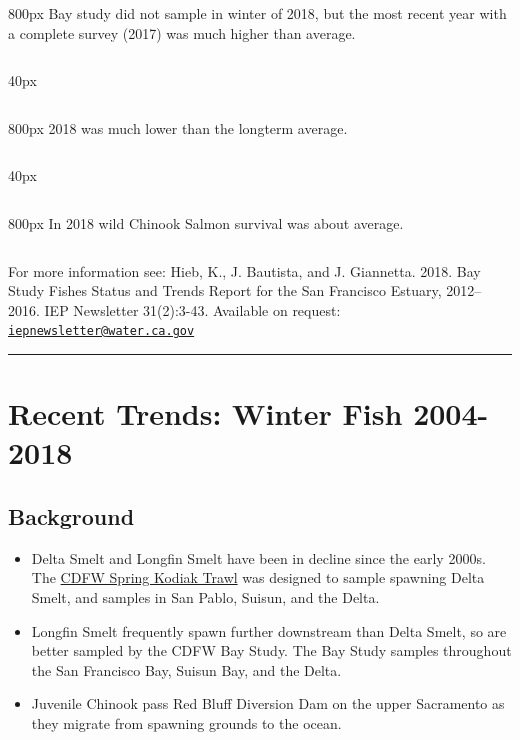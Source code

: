 \documentclass[
]{book}
\providecommand{\tightlist}{%
  \setlength{\itemsep}{0pt}\setlength{\parskip}{0pt}}
\begin{document}
\begin{column}{800px\textwidth}
Bay study did not sample in winter of 2018, but the most recent year with a complete survey (2017) was much higher than average.
\end{column}

\begin{column}{40px\textwidth}
~
\end{column}

\begin{column}{800px\textwidth}
2018 was much lower than the longterm average.
\end{column}

\begin{column}{40px\textwidth}
~
\end{column}

\begin{column}{800px\textwidth}
In 2018 wild Chinook Salmon survival was about average.
\end{column}

\begin{disclaimer}
For more information see: Hieb, K., J. Bautista, and J. Giannetta. 2018.
Bay Study Fishes Status and Trends Report for the San Francisco Estuary,
2012--2016. IEP Newsletter 31(2):3-43. Available on request:
\href{mailto:iepnewsletter@water.ca.gov}{\nolinkurl{iepnewsletter@water.ca.gov}}
\end{disclaimer}

\begin{center}\rule{0.5\linewidth}{0.5pt}\end{center}

\hypertarget{recent-trends-winter-fish-2004-2018}{%
\section{Recent Trends: Winter Fish 2004-2018}\label{recent-trends-winter-fish-2004-2018}}

\hypertarget{background-23}{%
\subsection{Background}\label{background-23}}

\begin{itemize}
\tightlist
\item
  Delta Smelt and Longfin Smelt have been in decline since the early 2000s. The \href{https://www.wildlife.ca.gov/Conservation/Delta/Spring-Kodiak-Trawl}{CDFW Spring Kodiak Trawl} was designed to sample spawning Delta Smelt, and samples in San Pablo, Suisun, and the Delta.
\item
  Longfin Smelt frequently spawn further downstream than Delta Smelt, so are better sampled by the CDFW Bay Study. The Bay Study samples throughout the San Francisco Bay, Suisun Bay, and the Delta.
\item
  Juvenile Chinook pass Red Bluff Diversion Dam on the upper Sacramento as they migrate from spawning grounds to the ocean.
\end{itemize}
\end{document}
